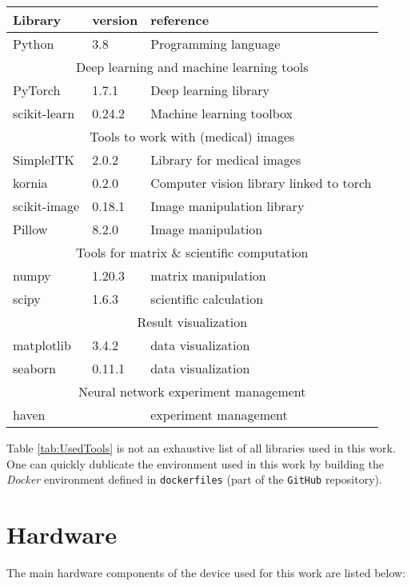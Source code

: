 \begin{SCtable}[\sidecaptionrelwidth][h]
 
  \begin{tabular}{ p{2cm} l l } 
   \hline
   \hline
   \textbf{Library} & \textbf{version} & \textbf{reference}    \\
   \hline 
  Python & 3.8 & Programming language \\
   \hline
   \multicolumn{3}{c}{Deep learning and machine learning tools} \\
   \hline
   PyTorch & 1.7.1 & Deep learning library \\ 
   scikit-learn & 0.24.2 & Machine learning toolbox \\
   \hline
   \multicolumn{3}{c}{Tools to work with (medical) images} \\
   \hline
   SimpleITK & 2.0.2 & Library for medical images \\ 
   kornia & 0.2.0 & Computer vision library linked to torch \\
   scikit-image & 0.18.1 & Image manipulation library \\
   Pillow & 8.2.0 & Image manipulation\\
   \hline
   \multicolumn{3}{c}{Tools for matrix \& scientific computation} \\
   \hline
   numpy & 1.20.3 & matrix manipulation \\
   scipy & 1.6.3 & scientific calculation \\
   \hline
   \multicolumn{3}{c}{Result visualization} \\
   \hline
   matplotlib & 3.4.2 & data visualization \\ 
   seaborn & 0.11.1 & data visualization \\
   \multicolumn{3}{c}{Neural network experiment management} \\
   \hline
   haven &  & experiment management \\ 
   \hline
   \hline
  \end{tabular}
  \caption{Python libraries used. \label{tab:UsedTools}}

\end{SCtable}

Table \ref{tab:UsedTools} is not an exhaustive list of all libraries used in this work.
One can quickly dublicate the environment used in this work by building the \textit{Docker} environment defined in \texttt{dockerfiles} (part of the \texttt{GitHub} repository).

\section{Hardware\label{sec:hardware}}
The main hardware components of the device used for this work are listed below:

